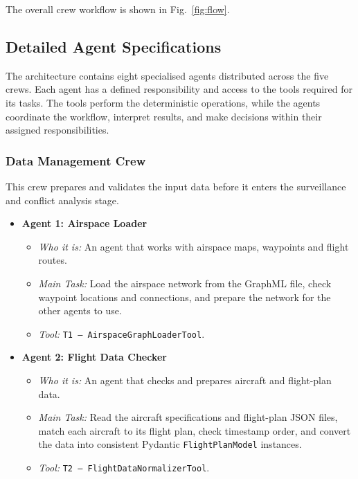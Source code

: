 The overall crew workflow is shown in Fig.~\ref{fig:flow}.


\subsection{Detailed Agent Specifications}

The architecture contains eight specialised agents distributed across the five crews. Each agent has a defined responsibility and access to the tools required for its tasks. The tools perform the deterministic operations, while the agents coordinate the workflow, interpret results, and make decisions within their assigned responsibilities.


\subsubsection{Data Management Crew}

This crew prepares and validates the input data before it enters the surveillance and conflict analysis stage.

\begin{itemize}[leftmargin=*]

    \item \textbf{Agent 1: Airspace Loader}
    \begin{itemize}
        \item \textit{Who it is:} An agent that works with airspace maps, waypoints and flight routes.
        \item \textit{Main Task:} Load the airspace network from the GraphML file, check waypoint locations and connections, and prepare the network for the other agents to use.
        \item \textit{Tool:} \texttt{T1 -- AirspaceGraphLoaderTool}.
    \end{itemize}

    \item \textbf{Agent 2: Flight Data Checker}
    \begin{itemize}
        \item \textit{Who it is:} An agent that checks and prepares aircraft and flight-plan data.
        \item \textit{Main Task:} Read the aircraft specifications and flight-plan JSON files, match each aircraft to its flight plan, check timestamp order, and convert the data into consistent Pydantic \texttt{FlightPlanModel} instances.
        \item \textit{Tool:} \texttt{T2 -- FlightDataNormalizerTool}.
    \end{itemize}

\end{itemize}


